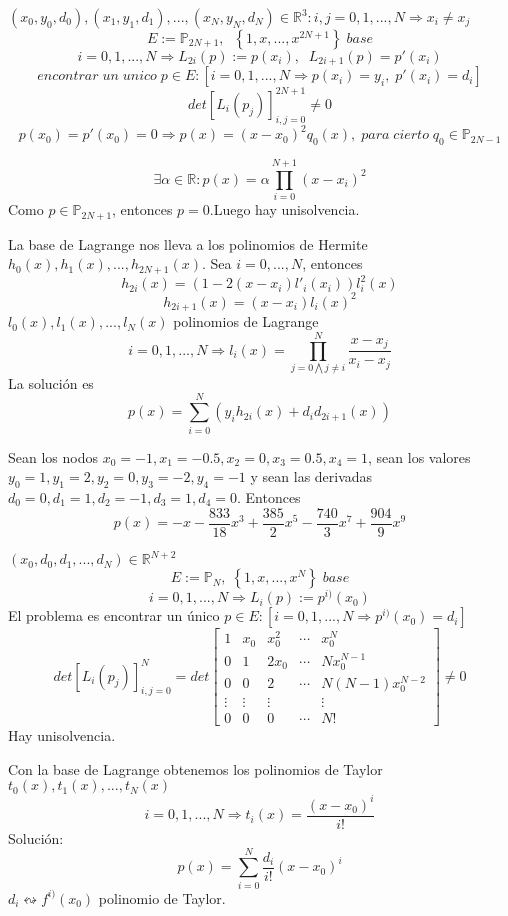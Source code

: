 \begin{nlist}
\item $(x_0,y_0,d_0),(x_1,y_1,d_1),...,(x_N,y_N,d_N) \in \mathbb{R}^3 : i,j=0,1,...,N \Rightarrow x_i \neq x_j $
\[ E := \mathbb{P}_{2N+1}, \; \; \left\lbrace 1,x,...,x^{2N+1} \right\rbrace \; base \]
\[ i = 0,1,...,N \Rightarrow L_{2i}(p) := p(x_i), \; \; L_{2i+1}(p) = p'(x_i) \]
\[ encontrar \; un \; unico \; p \in E : \left[ i = 0,1,...,N \Rightarrow p(x_i)=y_i, \; p'(x_i) = d_i \right] \]
\[ det \left[ L_i(p_j) \right] _{i,j=0}^{2N+1} \neq 0 \]
\[ p(x_0) = p'(x_0) = 0 \Rightarrow p(x)=(x-x_0)^2q_0(x), \; para \; cierto \; q_0 \in \mathbb{P}_{2N-1} \]

\[ \exists \alpha \in \mathbb{R}: p(x) = \alpha \prod_{i=0}^{N+1}(x-x_i)^2 \]
Como $p \in \mathbb{P}_{2N+1}$, entonces $p=0$.Luego hay unisolvencia.

La base de Lagrange nos lleva a los polinomios de Hermite {$h_0(x),h_1(x),...,h_{2N+1}(x)$}.
Sea $i=0,...,N$, entonces
\[ h_{2i}(x)=(1-2(x-x_i)l'_i(x_i))l_i^2(x) \]
\[ h_{2i+1}(x) = (x-x_i)l_i(x)^2 \]
{$l_0(x),l_1(x),...,l_N(x)$} polinomios de Lagrange
\[ i=0,1,...,N \Rightarrow l_i(x) = \prod_{j=0 \bigwedge j\neq i}^N \frac{x-x_j}{x_i-x_j}\]
La solución es
\[p(x) = \sum_{i=0}^N (y_ih_{2i}(x) + d_id_{2i+1}(x)) \]

	\begin{ejemplo}
	Sean los nodos $x_0=-1, x_1=-0.5, x_2=0, x_3=0.5, x_4=1$, sean los valores $y_0=1, y_1=2, y_2=0, y_3=-2, y_4=-1$ y sean las derivadas $d_0=0, d_1=1, d_2=-1, d_3=1, d_4=0$. Entonces
	\[ p(x) = -x - \frac{833}{18}x^3 + \frac{385}{2}x^5 - \frac{740}{3}x^7 + \frac{904}{9}x^9 \]
	\end{ejemplo}

\item $(x_0,d_0,d_1,...,d_N) \in \mathbb{R}^{N+2}$
\[ E:= \mathbb{P}_N, \; \left\lbrace 1,x,...,x^N \right\rbrace \; base \]
\[ i=0,1,...,N \Rightarrow L_i(p) := p^{i)}(x_0) \]
El problema es encontrar un único $p \in E : \left[ i=0,1,...,N \Rightarrow p^{i)}(x_0) = d_i \right] $
\[ det \left[ L_i(p_j) \right] _{i,j=0}^N = det \left[
\begin{array}{ccccc}
1 & x_0 & x_0^2 & \cdots & x_0^N \\
0 & 1 & 2x_0 & \cdots & Nx_0^{N-1} \\
0 & 0 & 2 & \cdots & N(N-1)x_0^{N-2} \\
\vdots & \vdots & \vdots & & \vdots \\
0 & 0 & 0 & \cdots & N!
\end{array}
\right] \neq 0 \]
Hay unisolvencia.

Con la base de Lagrange obtenemos los polinomios de Taylor {$t_0(x),t_1(x),...,t_N(x)$}
\[i=0,1,...,N \Rightarrow t_i(x) = \frac{(x-x_0)^i}{i!} \]
Solución:
\[ p(x) = \sum_{i=0}^N \frac{d_i}{i!}(x-x_0)^i \]
$d_i \leftrightsquigarrow f^{i)}(x_0)$ polinomio de Taylor.

\end{nlist}

